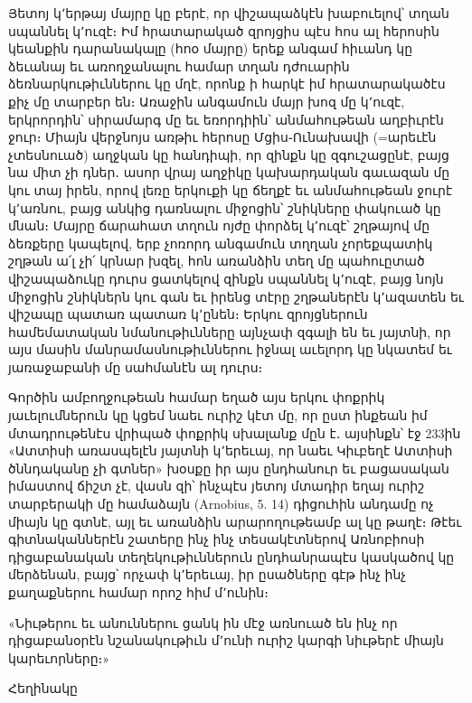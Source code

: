 \documentclass{article}
\begin{document}
{Յետոյ կ՚երթայ մայրը կը բերէ, որ վիշապաձկէն խաբուելով՝ տղան սպաննել կ՚ուզէ։ Իմ հրատարակած զրոյցիս պէս հոս ալ հերոսին կեանքին դարանակալը (հոօ մայրը) երեք անգամ հիւանդ կը ձեւանայ եւ առողջանալու համար տղան դժուարին ձեռնարկութիւններու կը մղէ, որոնք ի հարկէ իմ հրատարակածէս քիչ մը տարբեր են։ Առաջին անգամուն մայր խոզ մը կ՚ուզէ, երկրորդին՝ սիրամարգ մը եւ եռորդիին՝ անմահութեան աղբիւրէն ջուր։ Միայն վերջնոյս առթիւ հերոսը Մցիս֊Ունախավի (=արեւէն չտեսնուած) աղջկան կը հանդիպի, որ զինքն կը զգուշացընէ, բայց նա միտ չի դներ․ ասոր վրայ աղջիկը կախարդական գաւազան մը կու տայ իրեն, որով լեռը երկուքի կը ճեղքէ եւ անմահութեան ջուրէ կ՚առնու, բայց անկից դառնալու միջոցին՝ շնիկները փակուած կը մնան։ Մայրը ճարահատ տղուն ոյժը փորձել կ՚ուզէ՝ շղթայով մը ձեռքերը կապելով, երբ չոռորդ անգամուն տղղան չորեքպատիկ շղթան ա՛լ չի՛ կրնար խզել, հոն առանձին տեղ մը պահուըտած վիշապաձուկը դուրս ցատկելով զինքն սպաննել կ՚ուզէ, բայց նոյն միջոցին շնիկներն կու գան եւ իրենց տէրը շղթաներէն կ՚ազատեն եւ վիշապը պատառ պատառ կ՚ընեն։ Երկու զրոյցներուն համեմատական նմանութիւնները այնչափ զգալի են եւ յայտնի, որ այս մասին մանրամասնութիւններու իջնալ աւելորդ կը նկատեմ եւ յառաջաբանի մը սահմանէն ալ դուրս։

Գործին ամբողջութեան համար եղած այս երկու փոքրիկ յաւելումներուն կը կցեմ նաեւ ուրիշ կէտ մը, որ ըստ ինքեան իմ մտադրութենէս վրիպած փոքրիկ սխալանք մըն է․ այսինքն՝ էջ 233ին «Ատտիսի առասպելէն յայտնի կ՚երեւայ, որ նաեւ Կիւբեղէ Ատտիսի ծննդականը չի գտներ» խօսքը իր այս ընդհանուր եւ բացասական իմաստով ճիշտ չէ, վասն զի՝ ինչպէս յետոյ մտադիր եղայ ուրիշ տարբերակի մը համաձայն (Arnobius, 5. 14) դիցուհին անդամը ոչ միայն կը գտնէ, այլ եւ առանձին արարողութեամբ ալ կը թաղէ։ Թէեւ գիտնականներէն շատերը ինչ ինչ տեսակէտներով Առնոբիոսի դիցաբանական տեղեկութիւններուն ընդհանրապէս կասկածով կը մերձենան, բայց՝ որչափ կ՚երեւայ, իր ըսածները գէթ ինչ ինչ քաղաքներու համար որոշ հիմ մ՚ունին։

«Նիւթերու եւ անուններու ցանկ ին մէջ առնուած են ինչ որ դիցաբանօրէն նշանակութիւն մ՚ունի ուրիշ կարգի նիւթերէ միայն կարեւորները։»

\bigskip

Հեղինակը
}
\clearpage
\section*{}
\Large
\end{document}
